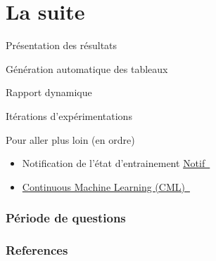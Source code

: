 \documentclass[aspectratio=169,10pt,xcolor=x11names,english,french]{beamer}
\newcommand{\link}[2]{\href{#1}{#2~{\smaller\faExternalLink*}}}
\begin{document}
	\section{La suite}
	\begin{frame}{Présentation des résultats}
				\centering
		\begin{minipage}{0.49\linewidth}
				\centering
				\fontsize{35}{35}\faTable\vfil
				\vspace{1em}
				\normalsize Génération automatique des tableaux
		\end{minipage}
		\begin{minipage}{0.49\linewidth}
				\centering
				\fontsize{35}{35}\vfil
				\vspace{1em}
				\normalsize Rapport dynamique
		\end{minipage}
	\end{frame}
	\begin{frame}
		\centering
		\fontsize{35}{35}\faRefresh\vfil
		\vspace{1em}
		\normalsize Itérations d'expérimentations
	\end{frame}
	
	\begin{frame}{Pour aller plus loin (en ordre)}
		\begin{itemize}
			\item Notification de l'état d'entrainement \link{https://notificationdoc.ca/}{Notif}
			\item \link{https://cml.dev/}{Continuous Machine Learning (CML)} 
		\end{itemize}
	\end{frame}
	
	\begin{frame}
		\frametitle{Période de questions}
		
		\centering
		\fontsize{100}{100}
		\faQuestion
		
	\end{frame}

	
	
	\begin{frame}[t, allowframebreaks]
		\frametitle{References}
		
		
	\end{frame}
	
	
	
\end{document}
